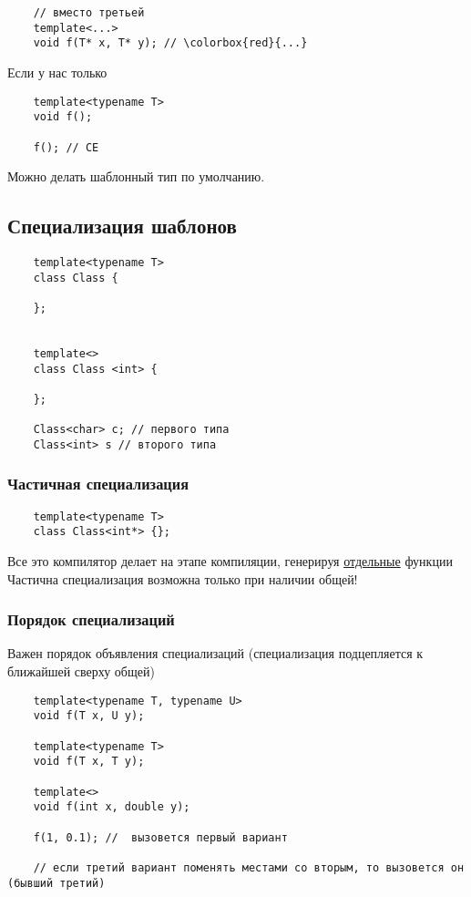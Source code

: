 \documentclass[12pt]{article}
\begin{document}
\begin{lstlisting}
	// вместо третьей
	template<...>
	void f(T* x, T* y); // \colorbox{red}{...}
\end{lstlisting}

Если у нас только

\begin{lstlisting}
	template<typename T>
	void f();
	
	f(); // CE
\end{lstlisting}

Можно делать шаблонный тип по умолчанию. 

\subsection{Специализация шаблонов}

\begin{lstlisting}
	template<typename T>
	class Class {
	
	};


	template<>
	class Class <int> {
		
	};
	
	Class<char> c; // первого типа
	Class<int> s // второго типа
\end{lstlisting}

\subsubsection{Частичная специализация}

\begin{lstlisting}
	template<typename T>
	class Class<int*> {};
\end{lstlisting}

Все это компилятор делает на этапе компиляции, генерируя \underline{отдельные} функции
Частична специализация возможна только при наличии общей!

\subsubsection{Порядок специализаций}

Важен порядок объявления специализаций (специализация подцепляется к ближайшей сверху общей)

\begin{lstlisting}
	template<typename T, typename U>
	void f(T x, U y);
	
	template<typename T>
	void f(T x, T y);
	
	template<>
	void f(int x, double y);
	
	f(1, 0.1); //  вызовется первый вариант
	
	// если третий вариант поменять местами со вторым, то вызовется он (бывший третий) 	
\end{lstlisting}
\end{document}
